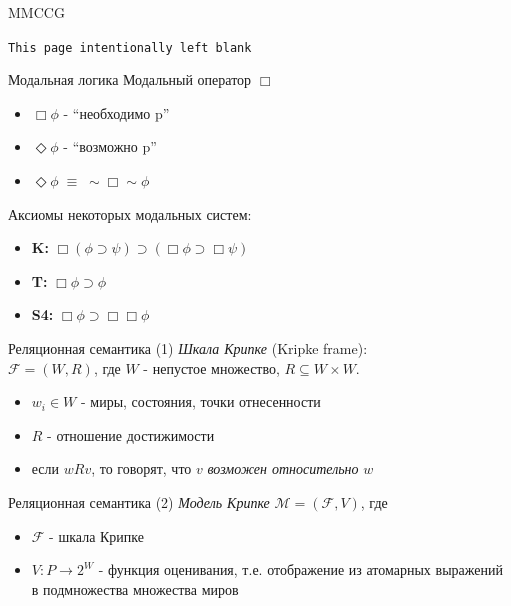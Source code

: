 \documentclass{beamer}
\begin{document}
\begin{frame}{MMCCG}
\begin{center}
\texttt{This page intentionally left blank}
\end{center}
\end{frame}

\begin{frame}{Модальная логика}
Модальный оператор $\Box$\\
\bigskip
\begin{itemize}
	\item $\Box \phi$ - ``необходимо p''
	\item $\Diamond \phi$ - ``возможно p''
	\item $\Diamond \phi \; \equiv \; \sim \Box \sim \phi$
\end{itemize}
\bigskip
Аксиомы некоторых модальных систем:
\begin{itemize}
  \item \textbf{K: } $\Box (\phi \supset \psi) \supset ( \Box \phi \supset \Box \psi)$
  \item \textbf{T: } $\Box \phi \supset \phi$
  \item \textbf{S4:} $\Box \phi \supset \Box \Box \phi$
\end{itemize}
\bigskip
\end{frame}

\begin{frame}{Реляционная семантика (1)}
\textit{Шкала Крипке} (Kripke frame):\\
\bigskip
$\mathcal{F} = (W, R)$, где $W$ - непустое множество, $R \subseteq W \times W$.\\
\bigskip
\begin{itemize}
  \item $w_i \in W$ - миры, состояния, точки отнесенности
  \item $R$ - отношение достижимости
  \item если $wRv$, то говорят, что $v$ \textit{возможен относительно} $w$
\end{itemize}
\end{frame}

\begin{frame}{Реляционная семантика (2)}
\textit{Модель Крипке} $\mathcal{M} = (\mathcal{F}, V)$, где  
\bigskip
\begin{itemize}
  \item $\mathcal{F}$ - шкала Крипке
  \item $V : P \to 2^W$ - функция оценивания, т.е. отображение из атомарных выражений в подмножества множества миров
\end{itemize}
\bigskip
\end{frame}
\end{document}
